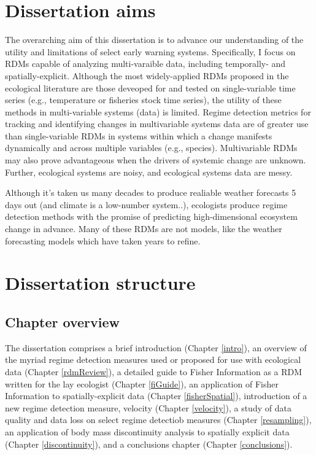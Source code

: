 \documentclass[12pt,twoside,openany]{reedthesis}
\begin{document}
\hypertarget{dissertation-aims}{%
\section{Dissertation aims}\label{dissertation-aims}}

The overarching aim of this dissertation is to advance our understanding of the utility and limitations of select early warning systems. Specifically, I focus on RDMs capable of analyzing multi-varaible data, including temporally- and spatially-explicit. Although the most widely-applied RDMs proposed in the ecological literature are those deveoped for and tested on single-variable time series (e.g., temperature or fisheries stock time series), the utility of these methods in multi-variable systems (data) is limited. Regime detection metrics for tracking and identifying changes in multivariable systems data are of greater use than single-variable RDMs in systems within which a change manifests dynamically and across multiple variables (e.g., species). Multivariable RDMs may also prove advantageous when the drivers of systemic change are unknown. Further, ecological systems are noisy, and ecological systems data are messy.

Although it's taken us many decades to produce realiable weather forecasts 5 days out (and climate is a low-number system..), ecologists produce regime detection methods with the promise of predicting high-dimensional ecosystem change in advance. Many of these RDMs are not models, like the weather forecasting models which have taken years to refine.

\hypertarget{dissertation-structure}{%
\section{Dissertation structure}\label{dissertation-structure}}

\hypertarget{chapter-overview}{%
\subsection{Chapter overview}\label{chapter-overview}}

The dissertation comprises a brief introduction (Chapter \ref{intro}), an overview of the myriad regime detection measures used or proposed for use with ecological data (Chapter \ref{rdmReview}), a detailed guide to Fisher Information as a RDM written for the lay ecologist (Chapter \ref{fiGuide}), an application of Fisher Information to spatially-explicit data (Chapter \ref{fisherSpatial}), introduction of a new regime detection measure, velocity (Chapter \ref{velocity}), a study of data quality and data loss on select regime detectiob measures (Chapter \ref{resampling}), an application of body mass discontinuity analysis to spatially explicit data (Chapter \ref{discontinuity}), and a conclusions chapter (Chapter \ref{conclusions}).
\end{document}

